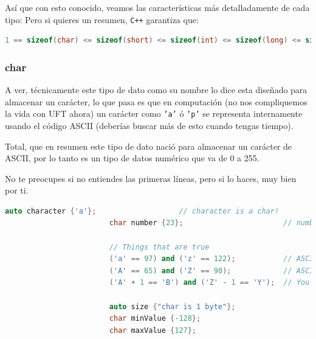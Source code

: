 \documentclass[12pt, fleqn]{report}                             %
\theoremstyle{break}                                            %
\newcommand{\textCode}[1]  { \texttt{#1} }                      %
\newcommand \Cpp  {\textCode{C++} }                               %
\begin{document}
                Así que con esto conocido, veamos las características más detalladamente de cada tipo:
                Pero si quieres un resumen, \Cpp garantiza que:
                \begin{lstlisting}[language=C++, gobble=20]
                    1 == sizeof(char) <= sizeof(short) <= sizeof(int) <= sizeof(long) <= sizeof(long long);
                \end{lstlisting}


                \subsubsection{char}

                    A ver, técnicamente este tipo de dato como su nombre lo dice esta diseñado para almacenar
                    un carácter, lo que pasa es que en computación (no nos compliquemos la vida con UFT ahora)
                    un carácter como \textCode{'a'} ó \textCode{'p'} se representa internamente usando el código
                    ASCII (deberías buscar más de esto cuando tengas tiempo).
                    
                    Total, que en resumen este tipo de dato nació para almacenar un carácter de ASCII, 
                    por lo tanto es un tipo de datos numérico que va de 0 a 255.

                    No te preocupes si no entiendes las primeras líneas, pero si lo haces, muy bien por ti.
                    \begin{lstlisting}[language=C++, gobble=24]
                        auto character {'a'};                   // character is a char!
                        char number {23};                       // number is a char!

                        // Things that are true
                        ('a' == 97) and ('z' == 122);           // ASCII is just numbers
                        ('A' == 65) and ('Z' == 90);            // ASCII is just numbers
                        ('A' + 1 == 'B') and ('Z' - 1 == 'Y');  // You can do arithmetic

                        auto size {"char is 1 byte"};
                        char minValue {-128};
                        char maxValue {127};
                    \end{lstlisting}
\end{document}
